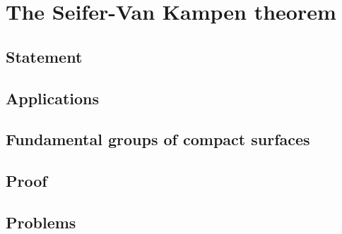 \chapter{The Seifer-Van Kampen theorem}
\section{Statement}
\section{Applications}
\section{Fundamental groups of compact surfaces}
\section{Proof}
\section{Problems}

